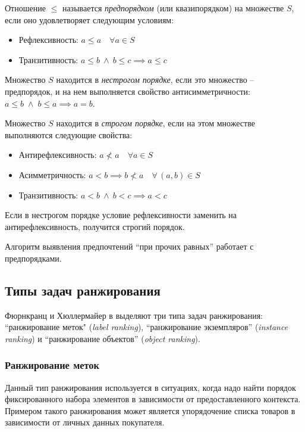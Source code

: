 	\begin{definition}
		\label{def:preorder}
		Отношение $\leq$ называется \emph{предпорядком} (или квазипорядком) на множестве $S$, если оно удовлетворяет следующим условиям\cite{harel:2000}:
		\begin{itemize}[itemsep=-1.5mm]
			\item Рефлексивность: $a \leq a \quad \forall a \in S$
			\item Транзитивность: $a \leq b\: \wedge\: b \leq c \implies a \leq c$ 
		\end{itemize}
	\end{definition}	
	\begin{definition}
		\label{def:nonstrict_order}
		Множество $S$ находится в \emph{нестрогом порядке}, если это множество – предпорядок, и на нем выполняется свойство антисимметричности\cite{Skiena:1991}: $a \leq b\; \wedge\; b \leq a \implies a = b$.
	\end{definition}
	\begin{definition}
		\label{def:strict_order}
		Множество $S$ находится в \emph{строгом порядке}, если на этом множестве выполняются следующие свойства:
		\begin{itemize}[itemsep=-1.5mm]
			\item Антирефлексивность: $ a \nless a \quad \forall a \in S$
			\item Асимметричность: $a < b \implies b \nless a \quad \forall \, (a, b) \in S$
			\item Транзитивность: $a < b\: \wedge\: b < c \implies a < c$
		\end{itemize}
		Если в нестрогом порядке условие рефлексивности заменить на антирефлексивность, получится строгий порядок.
	\end{definition}
	
	Алгоритм выявления предпочтений \enquote{при прочих равных} работает с предпорядками.
	
	\subsection{Типы задач ранжирования}
	Фюрнкранц и Хюллермайер в \cite{plbook:Introduction:2010} выделяют три типа задач ранжирования: ``ранжирование меток" (\emph{label ranking}), ``ранжирование экземпляров'' (\emph{instance ranking}) и ``ранжирование объектов'' (\emph{object ranking}).
	
	\subsubsection{Ранжирование меток}
	Данный тип ранжирования используется в ситуациях, когда надо найти порядок фиксированного набора элементов в зависимости от предоставленного контекста. Примером такого ранжирования может является упорядочение списка товаров в зависимости от личных данных покупателя.
	

